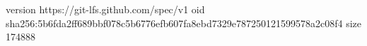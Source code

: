 version https://git-lfs.github.com/spec/v1
oid sha256:5b6fda2ff689bbf078c5b6776efb607fa8ebd7329e787250121599578a2c08f4
size 174888

